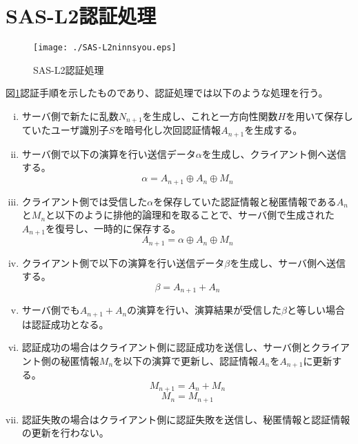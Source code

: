 \documentclass{thesis}
\begin{document}
\section{SAS-L2認証処理}
\begin{figure}[H]
 \center
 \texttt{[image: ./SAS-L2ninnsyou.eps]}
 \caption{SAS-L2認証処理}
 \label{sasl2ninnsyou}
\end{figure}
図\ref{sasl2ninnsyou}認証手順を示したものであり、認証処理では以下のような処理を行う。
\begin{enumerate}[(i)]
\item サーバ側で新たに乱数$N_{n+1}$を生成し、これと一方向性関数$H$を用いて保存していたユーザ識別子$S$を暗号化し次回認証情報$A_{n+1}$を生成する。
\item サーバ側で以下の演算を行い送信データ$\alpha$を生成し、クライアント側へ送信する。
\begin{equation}\label{eqn:alphagen}
	\alpha = A_{n+1} \oplus A_n \oplus M_n
\end{equation}
\item クライアント側では受信した$\alpha$を保存していた認証情報と秘匿情報である$A_n$と$M_n$と以下のように排他的論理和を取ることで、サーバ側で生成された$A_{n+1}$を復号し、一時的に保存する。
\begin{equation}\label{eqn:an1}
	A_{n+1} = \alpha \oplus A_n \oplus M_n
\end{equation}
\item クライアント側で以下の演算を行い送信データ$\beta$を生成し、サーバ側へ送信する。
\begin{equation}\label{eqn:aupd}
	\beta = A_{n+1} + A_n
\end{equation}
\item サーバ側でも$A_{n+1} + A_n$の演算を行い、演算結果が受信した$\beta$と等しい場合は認証成功となる。
\item 認証成功の場合はクライアント側に認証成功を送信し、サーバ側とクライアント側の秘匿情報$M_n$を以下の演算で更新し、認証情報$A_n$を$A_{n+1}$に更新する。
\begin{equation}\label{eqn:mn1gen}
	M_{n+1} = A_n + M_n
\end{equation}
\begin{equation}\label{eqn:mupd}
	M_n = M_{n+1}
\end{equation}
\item 認証失敗の場合はクライアント側に認証失敗を送信し、秘匿情報と認証情報の更新を行わない。
\end{enumerate}
\end{document}
